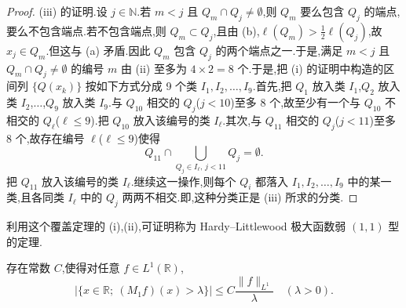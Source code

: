 \begin{proof}
(iii) 的证明.设 $j \in \mathbb{N}$.若 $m < j$ 且 $Q_{m} \cap Q_{j} \neq \emptyset$,则 $Q_{m}$ 要么包含 $Q_{j}$ 的端点,要么不包含端点.若不包含端点,则 $Q_{m} \subset Q_{j}$,且由 (b),$\ell(Q_{m}) > \frac{1}{2}\ell(Q_{j})$,故 $x_{j} \in Q_{m}$.但这与 (a) 矛盾.因此 $Q_{m}$ 包含 $Q_{j}$ 的两个端点之一.于是,满足 $m < j$ 且 $Q_{m} \cap Q_{j} \neq \emptyset$ 的编号 $m$ 由 (ii) 至多为 $4 \times 2 = 8$ 个.于是,把 (i) 的证明中构造的区间列 $\{Q(x_{k})\}$ 按如下方式分成 9 个类 $I_{1}, I_{2}, \ldots, I_{9}$.首先,把 $Q_{1}$ 放入类 $I_{1}$,$Q_{2}$ 放入类 $I_{2}$,$\ldots$,$Q_{9}$ 放入类 $I_{9}$.与 $Q_{10}$ 相交的 $Q_{j}$($j < 10$)至多 8 个,故至少有一个与 $Q_{10}$ 不相交的 $Q_{\ell}$($\ell \leq 9$).把 $Q_{10}$ 放入该编号的类 $I_{\ell}$.其次,与 $Q_{11}$ 相交的 $Q_{j}$($j < 11$)至多 8 个,故存在编号 $\ell$($\ell \leq 9$)使得
\begin{equation*}
Q_{11} \cap \bigcup_{Q_{j} \in I_{\ell},\, j < 11}Q_{j} = \emptyset.
\end{equation*}
把 $Q_{11}$ 放入该编号的类 $I_{\ell}$.继续这一操作,则每个 $Q_{i}$ 都落入 $I_{1}, I_{2}, \ldots, I_{9}$ 中的某一类,且各同类 $I_{\ell}$ 中的 $Q_{j}$ 两两不相交.即,这种分类正是 (iii) 所求的分类.
\end{proof}

利用这个覆盖定理的 (i),(ii),可证明称为 Hardy--Littlewood 极大函数弱 $(1,1)$ 型的定理.

\begin{theorem}\label{thm:1.5.2}
存在常数 $C$,使得对任意 $f \in L^{1}(\mathbb{R})$,
\begin{equation*}
|\{x \in \mathbb{R};\ (M_{1}f)(x) > \lambda\}| \leq C\frac{\| f \|_{L^{1}}}{\lambda} \quad (\lambda > 0).
\end{equation*}
\end{theorem}

